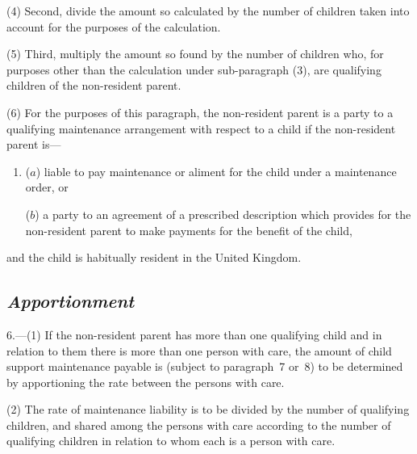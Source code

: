 \documentclass[12pt,a4paper]{article}
\begin{document}
(4) Second, divide the amount so calculated by the number of children taken into account for the purposes of the calculation.

(5) Third, multiply the amount so found by the number of children who, for purposes other than the calculation under sub-\hspace{0pt}paragraph (3), are qualifying children of the non-resident parent.

(6) For the purposes of this paragraph, the non-resident parent is a party to a qualifying maintenance arrangement with respect to a child if the non-resident parent is—
\begin{enumerate}\item[]
($a$) liable to pay maintenance or aliment for the child under a maintenance order, or

($b$) a party to an agreement of a prescribed description which provides for the non-resident parent to make payments for the benefit of the child,
\end{enumerate}
and the child is habitually resident in the United Kingdom.


\subsection*{\itshape Apportionment}

6.---(1) If the non-resident parent has more than one qualifying child and in relation to them there is more than one person with care, the amount of child support maintenance payable is (subject to paragraph~7 or~8) to be determined by apportioning the rate between the persons with care.

(2) The rate of maintenance liability is to be divided by the number of qualifying children, and shared among the persons with care according to the number of qualifying children in relation to whom each is a person with care.
\end{document}

